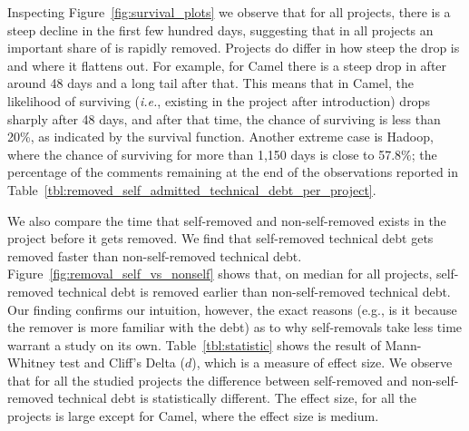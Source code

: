 Inspecting Figure~\ref{fig:survival_plots} we observe that for all projects, there is a steep decline in the first few hundred days, suggesting that in all projects an important share of \SATD is rapidly removed. Projects do differ in how steep the drop is and where it flattens out. For example, for Camel  there is a steep drop in \SATD after around 48 days and a long tail after that. This means that in Camel, the likelihood of \SATD surviving (\emph{i.e.}, existing in the project after introduction) drops sharply after 48 days, and after that time, the chance of surviving is less than 20\%, as indicated by the survival function. Another extreme case is Hadoop, where the chance of \SATD surviving for more than 1,150 days is close to 57.8\%; the percentage
of the \SATD comments remaining at the end of the observations reported in Table~\ref{tbl:removed_self_admitted_technical_debt_per_project}. 


We also compare the time that self-removed and non-self-removed \SATD exists in the project before it gets removed. We find that self-removed technical debt gets removed faster than non-self-removed technical debt. Figure~\ref{fig:removal_self_vs_nonself} shows that, on median for all projects, self-removed technical debt is removed earlier than non-self-removed technical debt. Our finding confirms our intuition, however, the exact reasons (e.g., is it because the remover is more familiar with the debt) as to why self-removals take less time warrant a study on its own. Table~\ref{tbl:statistic} shows the result of  Mann-Whitney test and Cliff's Delta ($d$), which is a measure of effect size. We observe that for all the studied projects the difference between self-removed and non-self-removed technical debt is statistically different. The effect size, for all the projects is large except for Camel, where the effect size is medium.





